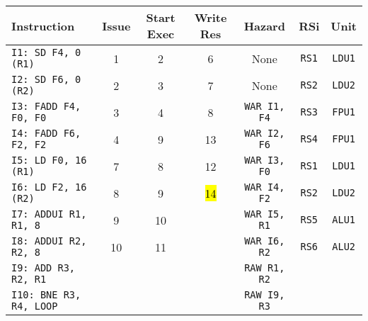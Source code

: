 \begin{enumerate}
    \begin{table}[!htp]
        \centering
        \begin{adjustbox}{width={\textwidth},totalheight={\textheight},keepaspectratio}
        \begin{tabular}{@{} l c c c c c c @{}}
            \toprule
            \textbf{Instruction} & \textbf{Issue} & \textbf{Start Exec} & \textbf{Write Res} & \textbf{Hazard} & \textbf{RSi} & \textbf{Unit} \\
            \midrule
            \texttt{I1: SD F4, 0 (R1)}      & 1 & 2 & 6 & None  & \texttt{RS1}   & \texttt{LDU1}  \\ [.5em]
            \texttt{I2: SD F6, 0 (R2)}      & 2 & 3 & 7 & None  & \texttt{RS2}   & \texttt{LDU2}  \\ [.5em]
            \texttt{I3: FADD F4, F0, F0}    & 3 & 4 & 8 & \texttt{WAR I1, F4}  & \texttt{RS3} & \texttt{FPU1} \\ [.5em]
            \texttt{I4: FADD F6, F2, F2}    & 4 & 9 & 13 & \texttt{WAR I2, F6} & \texttt{RS4} & \texttt{FPU1} \\ [.5em]
            \texttt{I5: LD F0, 16 (R1)}     & 7 & 8 & 12 & \texttt{WAR I3, F0} & \texttt{RS1} & \texttt{LDU1} \\ [.5em]
            \texttt{I6: LD F2, 16 (R2)}     & 8 & 9 & \hl{14} & \texttt{WAR I4, F2} & \texttt{RS2} & \texttt{LDU2} \\ [.5em]
            \texttt{I7: ADDUI R1, R1, 8}    & 9 & 10 &   & \texttt{WAR I5, R1} & \texttt{RS5} & \texttt{ALU1} \\ [.5em]
            \texttt{I8: ADDUI R2, R2, 8}    & 10 & 11 &   & \texttt{WAR I6, R2} & \texttt{RS6} & \texttt{ALU2} \\ [.5em]
            \texttt{I9: ADD R3, R2, R1}     &   &   &   & \texttt{RAW R1, R2} &       &       \\ [.5em]
            \texttt{I10: BNE R3, R4, LOOP}   &   &   &   & \texttt{RAW I9, R3} &       &       \\
            \bottomrule
        \end{tabular}
        \end{adjustbox}
    \end{table}
    

\end{enumerate}
